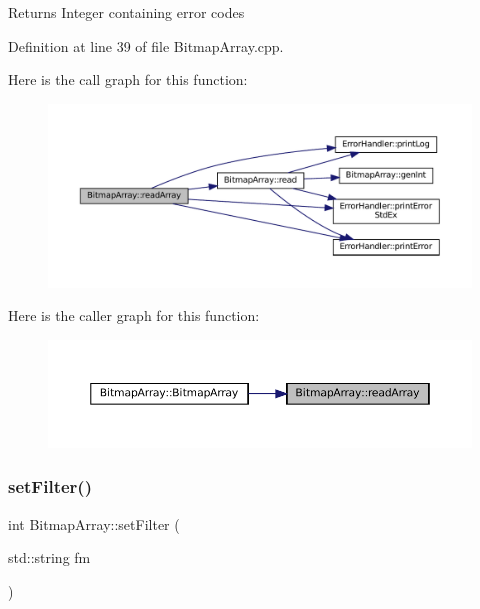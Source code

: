 \begin{DoxyReturn}{Returns}
Integer containing error codes 
\end{DoxyReturn}


Definition at line 39 of file Bitmap\+Array.\+cpp.

Here is the call graph for this function\+:
\nopagebreak
\begin{figure}[H]
\begin{center}
\leavevmode
\includegraphics[width=350pt]{classBitmapArray_a4ce4b5acc896040075be63a559799e7e_cgraph}
\end{center}
\end{figure}
Here is the caller graph for this function\+:
\nopagebreak
\begin{figure}[H]
\begin{center}
\leavevmode
\includegraphics[width=350pt]{classBitmapArray_a4ce4b5acc896040075be63a559799e7e_icgraph}
\end{center}
\end{figure}
\mbox{\label{classBitmapArray_a432bda57a77788bfd54e3310c9e83c0c}} 
\subsubsection{\texorpdfstring{setFilter()}{setFilter()}}
{\footnotesize\ttfamily int Bitmap\+Array\+::set\+Filter (\begin{DoxyParamCaption}\item[{std\+::string}]{fm }\end{DoxyParamCaption})}



